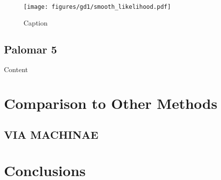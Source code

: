 \documentclass[twocolumn]{aastex631}
\begin{document}
            \begin{figure}
                \centering
                \texttt{[image: figures/gd1/smooth\_likelihood.pdf]}
                \caption{Caption}
                \label{fig:gd1-heatmap}
            \end{figure}




    \subsection{Palomar 5} \label{sub:pal5}

        Content




\section{Comparison to Other Methods} \label{sec:comparison}

    \subsection[STREAMFINDER]{\cite{2018MNRAS.477.4063M}}

        


    \subsection{VIA MACHINAE}{\cite{2022MNRAS.509.5992S}}


    \subsection[Uniform Modeling of 13 Stellar Streams]{\cite{PatrickEtAl2022}}



\section{Conclusions} \label{sec:conclusions}
\end{document}

